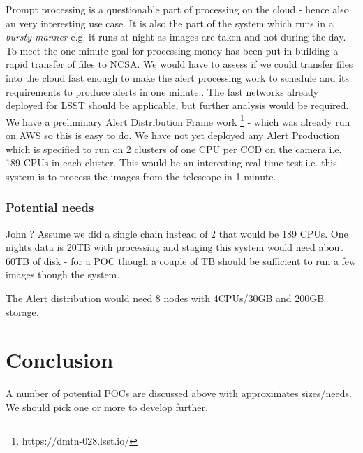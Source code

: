 Prompt processing  is a questionable part of processing on the cloud - hence also an very interesting use case. It is also the part of the system which runs in a {\em bursty manner} e.g. it runs at night as images are taken and not during the day.
To meet the one minute goal for processing money has been put in building a rapid transfer of files to NCSA.
We would have to assess if we could transfer files into the cloud fast enough to make the alert processing work to schedule and its requirements to produce alerts in one minute..
The fast networks already deployed for LSST should be applicable, but further analysis would be required.
We have a preliminary Alert Distribution Frame work \footnote{https://dmtn-028.lsst.io/} - which was already run on AWS so this is easy to do.
We have not yet deployed any Alert Production which is specified to run on  2 clusters of one CPU per CCD on the camera i.e. 189 CPUs in each cluster.
This would be an interesting real time test i.e. this system is to process the images from the telescope in 1 minute.

\subsubsection{Potential needs}
{\color{red} John ?}
 Assume we did a single chain instead of 2 that would be 189 CPUs.  One nights data is 20TB with processing and staging this system would need about 60TB of disk - for a POC though a couple of TB should be sufficient to run a few images though the system.

The Alert distribution would need 8 nodes with 4CPUs/30GB and 200GB storage.



\section{Conclusion}
A number of potential POCs are discussed above with approximates sizes/needs. We should pick one or more to develop further.
